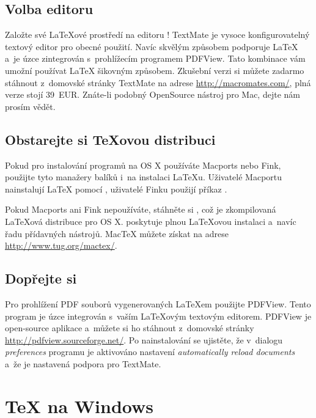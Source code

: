 \subsection{Volba editoru}

Založte své \LaTeX ové prostředí na editoru ! TextMate je
vysoce konfigurovatelný textový editor pro obecné použití. Navíc skvělým
způsobem podporuje \LaTeX{} a~je úzce zintegrován s~prohlížecím
programem \mbox{PDFView}. Tato kombinace vám umožní používat \LaTeX{}
šikovným  způsobem.
Zkušební verzi si můžete zadarmo stáhnout z~domovské stránky TextMate 
na adrese \url{http://macromates.com/}, plná verze stojí 39~EUR.
Znáte-li podobný OpenSource nástroj pro Mac, dejte nám prosím vědět.

\subsection{Obstarejte si \TeX ovou distribuci}

Pokud pro instalování programů na OS X používáte Macports nebo Fink,
použijte tyto manažery balíků i~na instalaci \LaTeX u. Uživatelé Macportu
nainstalují \LaTeX{} pomocí ,
uživatelé Finku použijí příkaz .

Pokud Macports ani Fink nepoužíváte, stáhněte si , což je
zkompilovaná \LaTeX ová distribuce pro OS X.  poskytuje
plnou \LaTeX ovou instalaci a~navíc řadu přídavných nástrojů. Mac\TeX
můžete získat na adrese \url{http://www.tug.org/mactex/}.

\subsection{Dopřejte si }

Pro prohlížení PDF souborů vygenerovaných \LaTeX em použijte PDFView. Tento
program je úzce integrován s~vaším \LaTeX ovým textovým editorem. PDFView
je open-source aplikace a~můžete si ho stáhnout z~domovské stránky
\url{http://pdfview.sourceforge.net/}. Po nainstalování se ujistěte,
že v~dialogu \emph{preferences} programu je aktivováno
nastavení \emph{automatically reload documents} a~že je nastavená
podpora pro TextMate.

\section{\TeX{} na Windows}

